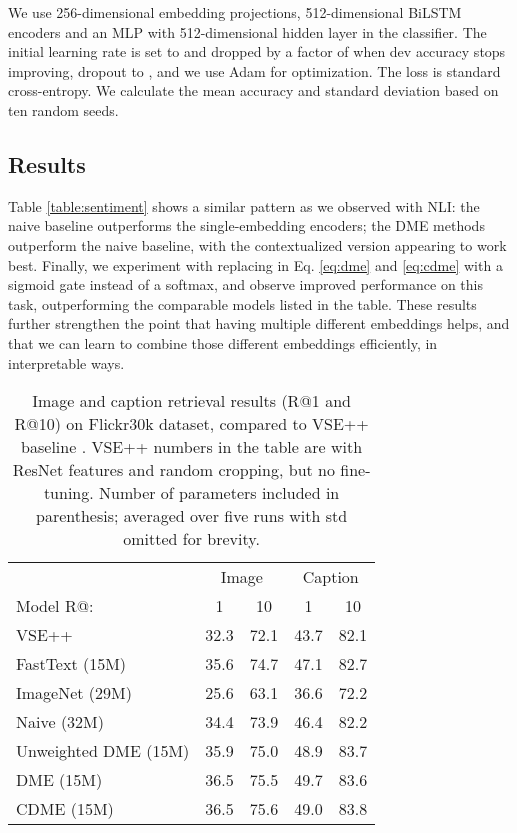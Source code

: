 \documentclass[11pt,a4paper]{article}
\begin{document}
We use 256-dimensional embedding projections, 512-dimensional BiLSTM encoders and an MLP with 512-dimensional hidden layer in the classifier. The initial learning rate is set to  and dropped by a factor of  when dev accuracy stops improving, dropout to , and we use Adam for optimization. The loss is standard cross-entropy. We calculate the mean accuracy and standard deviation based on ten random seeds.

\subsection{Results}
Table \ref{table:sentiment} shows a similar pattern as we observed with NLI: the naive baseline outperforms the single-embedding encoders; the DME methods outperform the naive baseline, with the contextualized version appearing to work best. Finally, we experiment with replacing  in Eq. \ref{eq:dme} and \ref{eq:cdme} with a sigmoid gate instead of a softmax, and observe improved performance on this task, outperforming the comparable models listed in the table. These results further strengthen the point that having multiple different embeddings helps, and that we can learn to combine those different embeddings efficiently, in interpretable ways.

\begin{table}[t]
  \centering
  \small
  \begin{tabular}{lcccc}
    \toprule
    & \multicolumn{2}{c}{Image} & \multicolumn{2}{c}{Caption}\\
    Model  R@: & 1 & 10 & 1 & 10\\
    \midrule
    VSE++ & 32.3 & 72.1 & 43.7 & 82.1\\\midrule
	FastText (15M) & 35.6 & 74.7 & 47.1 & 82.7 \\
	ImageNet (29M) & 25.6 & 63.1 & 36.6  & 72.2 \\
	Naive (32M) & 34.4 & 73.9 & 46.4 & 82.2\\\midrule
	Unweighted DME (15M) & 35.9 & 75.0 & 48.9 & 83.7\\
    DME (15M) & 36.5 & 75.5 & 49.7 & 83.6\\
CDME (15M) & 36.5 & 75.6 & 49.0 & 83.8\\
\bottomrule
  \end{tabular}
  \caption{\label{table:imgcap}Image and caption retrieval results (R@1 and R@10) on Flickr30k dataset, compared to VSE++ baseline \cite{Faghri:2017arxiv}. VSE++ numbers in the table are with ResNet features and random cropping, but no fine-tuning. Number of parameters included in parenthesis; averaged over five runs with std omitted for brevity.}
\end{table}
\end{document}
